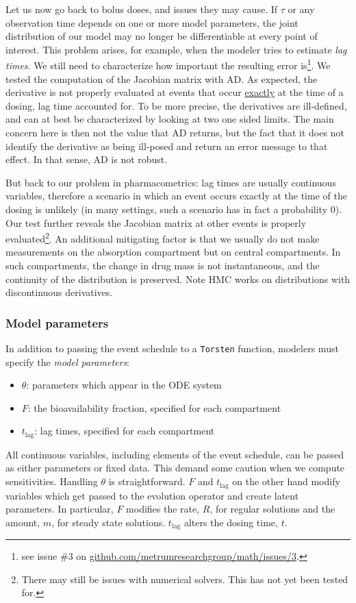\documentclass[11pt]{article}
\begin{document}
Let us now go back to bolus doses, and issues they may cause.
If $\tau$ or any observation time depends on one or 
more model parameters,
the joint distribution of our model may no longer be differentiable at every point
of interest.
This problem arises, for example, when the modeler tries to estimate \textit{lag times}.
%
We still need to characterize how important the resulting error is\footnote{see issue \#3 on 
\url{github.com/metrumresearchgroup/math/issues/3}.}. We tested the computation of the Jacobian matrix
with AD. 
As expected, the derivative is not properly evaluated  at events that occur \underline{exactly} at the time 
of a dosing, lag time accounted for.
To be more precise, the derivatives are ill-defined, and can at best be characterized by
looking at two one sided limits.
The main concern here is then not the value that AD returns, but the fact that it
does not identify the derivative as being ill-posed and return an error message to that effect.
In that sense, AD is not robust.

But back to our problem in pharmacometrics: lag times are usually continuous variables, therefore 
a scenario in which an event occurs exactly at the time of the dosing  is unlikely
(in many settings, such a scenario has in fact a probability 0). 
%
Our test further reveals the Jacobian matrix at other events is properly 
evaluated\footnote{There may still be issues with numerical solvers. This has not yet been tested for.}.
An additional mitigating factor is that we usually do not make measurements on the absorption
compartment but on central compartments. 
In such compartments, the change in drug mass is not instantaneous,
and the continuity of the distribution is preserved.
Note HMC works on distributions with discontinuous derivatives.



\subsubsection{Model parameters}\label{modelParms}

In addition to passing the event schedule to a \texttt{Torsten} function, modelers must specify the 
\textit{model parameters}:
\begin{itemize}
  \item $\theta$: parameters which appear in the ODE system
  \item $F$: the bioavailability fraction, specified for each compartment
  \item $t_\mathrm{lag}$: lag times, specified for each compartment
\end{itemize}
%
All continuous variables, including elements of the event schedule, can be passed as either 
parameters or fixed data. This demand some caution when we compute sensitivities. Handling 
$\theta$ is straightforward.  $F$ and $t_\mathrm{lag}$ on the other hand modify variables which
get passed to the evolution operator and create latent parameters. In particular, $F$ modifies 
the rate, $R$, for regular solutions and the amount, $m$, for steady state solutions.
$t_\mathrm{lag}$ alters the dosing time, $t$. \ \\
\end{document}
